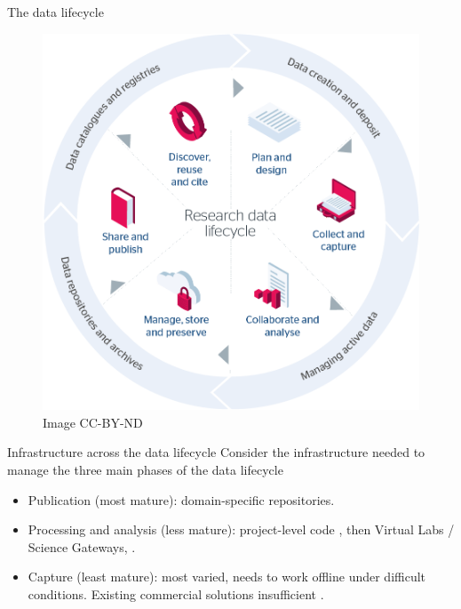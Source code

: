 \documentclass[aspectratio=169, 11pt]{beamer} %
\begin{document}
\begin{frame}{The data lifecycle}
 \begin{figure}[H]
    \centering
        \includegraphics[height=.75\textheight]{figures/research-data-life-diagram.png}
        \caption{\cite{Jisc2018-gx} Image CC-BY-ND}
        \label{fig:figure9}
 \end{figure}
\end{frame}

\begin{frame}{Infrastructure across the data lifecycle}
    Consider the infrastructure needed to manage the three main phases of the data lifecycle
    \begin{itemize}[label=\textbullet]
        \item Publication (most mature): domain-specific repositories.
        \item Processing and analysis (less mature): project-level code \cite{Stewart_Lowndes2017-lj}, then Virtual Labs / Science Gateways, \cite{Alveo2019-tk}.
        \item Capture (least mature): most varied, needs to work offline under difficult conditions. Existing commercial solutions insufficient \cite{Bureau_of_Reclamation2017-xl}.
    \end{itemize}
\end{frame}
\end{document}
